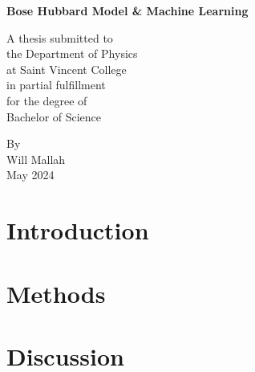 \documentclass[
    preprint,
    amsmath, amssymb,
    aps, onecolumn,
    floatfix
]{revtex4-2}
\begin{document}
\begin{titlepage}
    \begin{center}
    
        
        \textbf{Bose Hubbard Model \& Machine Learning}
        
        \vspace{5.5cm}
        A thesis submitted to\\ the Department of Physics\\ at Saint Vincent College\\ in partial fulfillment\\ for the degree of\\ Bachelor of Science
        
        \vspace{4.5cm}			
        By\\
        Will Mallah\\
        May 2024
        
        
    \end{center}
\end{titlepage}


\begin{abstract}
    
\end{abstract}

\maketitle

\section{Introduction}


\section{Methods}


\section{Discussion}


\nocite{*}
\end{document}
